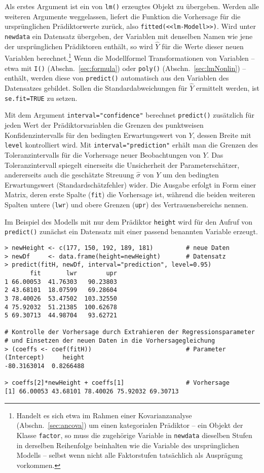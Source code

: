 Als erstes Argument ist ein von \lstinline!lm()! erzeugtes Objekt zu übergeben. Werden alle weiteren Argumente weggelassen, liefert die Funktion die Vorhersage für die ursprünglichen Prädiktorwerte zurück, also \lstinline!fitted(<<lm-Modell>>)!. Wird unter \lstinline!newdata! ein Datensatz übergeben, der Variablen mit denselben Namen wie jene der ursprünglichen Prädiktoren enthält, so wird $\hat{Y}$ für die Werte dieser neuen Variablen berechnet.\footnote{Handelt es sich etwa im Rahmen einer Kovarianzanalyse (Abschn.\ \ref{sec:ancova}) um einen kategorialen Prädiktor -- ein Objekt der Klasse \lstinline!factor!, so muss die zugehörige Variable in \lstinline!newdata! dieselben Stufen in derselben Reihenfolge beinhalten wie die Variable des ursprünglichen Modells -- selbst wenn nicht alle Faktorstufen tatsächlich als Ausprägung vorkommen.} Wenn die Modellformel Transformationen von Variablen -- etwa mit \lstinline!I()! (Abschn.\ \ref{sec:formula}) oder \lstinline!poly()! (Abschn.\ \ref{sec:lmNonlin}) -- enthält, werden diese von \lstinline!predict()! automatisch aus den Variablen des Datensatzes gebildet. Sollen die Standardabweichungen für $\hat{Y}$ ermittelt werden, ist \lstinline!se.fit=TRUE! zu setzen.

Mit dem Argument \lstinline!interval="confidence"! berechnet \lstinline!predict()! zusätzlich für jeden Wert der Prädiktorvariablen die Grenzen des punktweisen Konfidenzintervalls für den bedingten Erwartungswert von $Y$, dessen Breite mit \lstinline!level! kontrolliert wird. Mit \lstinline!interval="prediction"! erhält man die Grenzen des Toleranzintervalls für die Vorhersage neuer Beobachtungen von $Y$. Das Toleranzintervall spiegelt einerseits die Unsicherheit der Parameterschätzer, andererseits auch die geschätzte Streuung $\hat{\sigma}$ von $Y$ um den bedingten Erwartungswert (Standardschätzfehler) wider. Die Ausgabe erfolgt in Form einer Matrix, deren erste Spalte (\lstinline!fit!) die Vorhersage ist, während die beiden weiteren Spalten untere (\lstinline!lwr!) und obere Grenzen (\lstinline!upr!) des Vertrauensbereichs nennen.

Im Beispiel des Modells mit nur dem Prädiktor \lstinline!height! wird für den Aufruf von \lstinline!predict()! zunächst ein Datensatz mit einer passend benannten Variable erzeugt.
\begin{lstlisting}
> newHeight <- c(177, 150, 192, 189, 181)         # neue Daten
> newDf     <- data.frame(height=newHeight)       # Datensatz
> predict(fitH, newDf, interval="prediction", level=0.95)
       fit       lwr        upr
1 66.00053  41.76303   90.23803
2 43.68101  18.07599   69.28604
3 78.40026  53.47502  103.32550
4 75.92032  51.21385  100.62678
5 69.30713  44.98704   93.62721

# Kontrolle der Vorhersage durch Extrahieren der Regressionsparameter
# und Einsetzen der neuen Daten in die Vorhersagegleichung
> (coeffs <- coef(fitH))                          # Parameter
(Intercept)     height
-80.3163014  0.8266488

> coeffs[2]*newHeight + coeffs[1]                 # Vorhersage
[1] 66.00053 43.68101 78.40026 75.92032 69.30713
\end{lstlisting}


